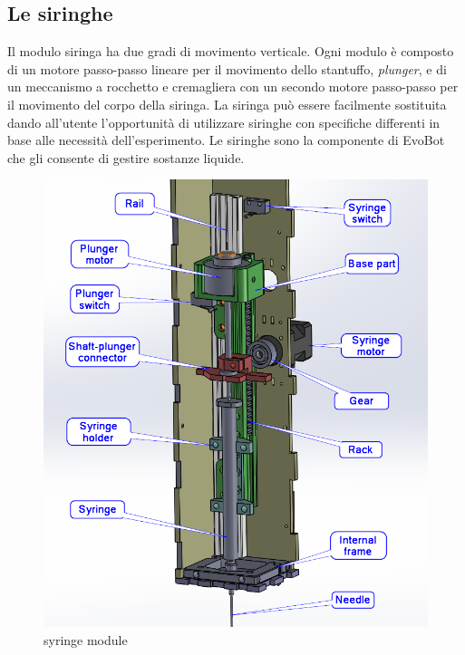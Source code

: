 \subsection{Le siringhe}
\label{sec:01456}
Il modulo siringa ha due gradi di movimento verticale. Ogni modulo è composto di un motore passo-passo lineare per il movimento dello stantuffo, \emph{plunger}, e di un meccanismo a rocchetto e cremagliera con un secondo motore passo-passo per il movimento del corpo della siringa. La siringa può essere facilmente sostituita dando all'utente l'opportunità di utilizzare siringhe con specifiche differenti in base alle necessità dell'esperimento. Le siringhe sono la componente di EvoBot che gli consente di gestire sostanze liquide.
	\begin{figure}[h]
	  \includegraphics[scale=0.30]{immagini/syringe_parts.png}
		\centering
	 \caption{syringe module}
	\end{figure} 

\pagebreak 
